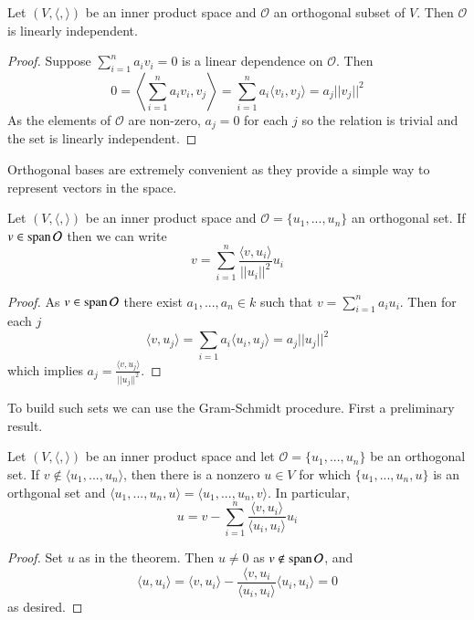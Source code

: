 \begin{theorem}
    Let $(V,\langle,\rangle)$ be an inner product space and $\mathcal{O}$ an orthogonal subset of $V$. Then $\mathcal{O}$ is linearly independent.
\end{theorem}
\begin{proof}
    Suppose $\sum_{i=1}^na_iv_i = 0$ is a linear dependence on $\mathcal{O}$. Then \begin{equation*}
        0 = \left\langle \sum_{i=1}^na_iv_i, v_j\right\rangle = \sum_{i=1}^na_i\langle v_i,v_j\rangle = a_j||v_j||^2
    \end{equation*}
    As the elements of $\mathcal{O}$ are non-zero, $a_j = 0$ for each $j$ so the relation is trivial and the set is linearly independent.
\end{proof}

Orthogonal bases are extremely convenient as they provide a simple way to represent vectors in the space. 

\begin{theorem}
    Let $(V,\langle,\rangle)$ be an inner product space and $\mathcal{O} = \{u_1,...,u_n\}$ an orthogonal set. If $v \in \operatorname{span}\mathcal{O}$ then we can write \begin{equation*}
        v = \sum_{i=1}^n\frac{\langle v,u_i\rangle}{||u_i||^2}u_i
    \end{equation*}
\end{theorem}
\begin{proof}
    As $v \in \operatorname{span}\mathcal{O}$ there exist $a_1,...,a_n \in k$ such that $v = \sum_{i=1}^na_iu_i$. Then for each $j$ \begin{equation*}
        \langle v,u_j\rangle = \sum_{i=1}a_i\langle u_i,u_j\rangle = a_j||u_j||^2
    \end{equation*}
    which implies $a_j = \frac{\langle v,u_j\rangle}{||u_j||^2}$.
\end{proof}

To build such sets we can use the Gram-Schmidt procedure. First a preliminary result.

\begin{theorem}
    Let $(V,\langle,\rangle)$ be an inner product space and let $\mathcal{O} = \{u_1,...,u_n\}$ be an orthogonal set. If $v \notin \langle u_1,...,u_n\rangle$, then there is a nonzero $u \in V$ for which $\{u_1,...,u_n,u\}$ is an orthgonal set and $\langle u_1,...,u_n,u\rangle = \langle u_1,...,u_n,v\rangle$. In particular, \begin{equation*}
        u = v-\sum_{i=1}^n\frac{\langle v,u_i\rangle}{\langle u_i,u_i\rangle}u_i
    \end{equation*}
\end{theorem}
\begin{proof}
    Set $u$ as in the theorem. Then $u \neq 0$ as $v \notin\operatorname{span}\mathcal{O}$, and \begin{equation*}
        \langle u,u_i\rangle = \langle v,u_i\rangle - \frac{\langle v,u_i}{\langle u_i,u_i\rangle}\langle u_i,u_i\rangle = 0
    \end{equation*}
    as desired.
\end{proof}

